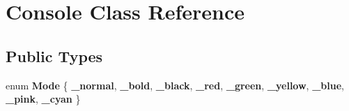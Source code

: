 \hypertarget{classConsole}{}\section{Console Class Reference}
\label{classConsole}
\subsection*{Public Types}
\begin{DoxyCompactItemize}
\item 
\mbox{\label{classConsole_af4999210d240ff9706a5a08a2fc7d80f}} 
enum {\bfseries Mode} \{ \newline
{\bfseries \+\_\+normal}, 
{\bfseries \+\_\+bold}, 
{\bfseries \+\_\+black}, 
{\bfseries \+\_\+red}, 
\newline
{\bfseries \+\_\+green}, 
{\bfseries \+\_\+yellow}, 
{\bfseries \+\_\+blue}, 
{\bfseries \+\_\+pink}, 
\newline
{\bfseries \+\_\+cyan}
 \}
\end{DoxyCompactItemize}
